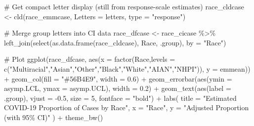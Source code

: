 \documentclass[
  letterpaper,
  DIV=11,
  numbers=noendperiod]{scrartcl}
\newenvironment{Shaded}{\begin{snugshade}}{\end{snugshade}}
\newcommand{\AttributeTok}[1]{\textcolor[rgb]{0.40,0.45,0.13}{#1}}
\newcommand{\CommentTok}[1]{\textcolor[rgb]{0.37,0.37,0.37}{#1}}
\newcommand{\DecValTok}[1]{\textcolor[rgb]{0.68,0.00,0.00}{#1}}
\newcommand{\FloatTok}[1]{\textcolor[rgb]{0.68,0.00,0.00}{#1}}
\newcommand{\FunctionTok}[1]{\textcolor[rgb]{0.28,0.35,0.67}{#1}}
\newcommand{\NormalTok}[1]{\textcolor[rgb]{0.00,0.23,0.31}{#1}}
\newcommand{\OtherTok}[1]{\textcolor[rgb]{0.00,0.23,0.31}{#1}}
\newcommand{\SpecialCharTok}[1]{\textcolor[rgb]{0.37,0.37,0.37}{#1}}
\newcommand{\StringTok}[1]{\textcolor[rgb]{0.13,0.47,0.30}{#1}}
\begin{document}
\begin{Shaded}
\begin{Highlighting}[]
\CommentTok{\# Get compact letter display (still from response{-}scale estimates)}
\NormalTok{race\_cldcase }\OtherTok{\textless{}{-}} \FunctionTok{cld}\NormalTok{(race\_emmcase, }\AttributeTok{Letters =}\NormalTok{ letters, }\AttributeTok{type =} \StringTok{"response"}\NormalTok{)}

\CommentTok{\# Merge group letters into CI data}
\NormalTok{race\_dfcase }\OtherTok{\textless{}{-}}\NormalTok{ race\_cicase }\SpecialCharTok{\%\textgreater{}\%}
  \FunctionTok{left\_join}\NormalTok{(}\FunctionTok{select}\NormalTok{(}\FunctionTok{as.data.frame}\NormalTok{(race\_cldcase), Race, .group), }\AttributeTok{by =} \StringTok{"Race"}\NormalTok{)}

\CommentTok{\# Plot}
\FunctionTok{ggplot}\NormalTok{(race\_dfcase, }\FunctionTok{aes}\NormalTok{(}\AttributeTok{x =} \FunctionTok{factor}\NormalTok{(Race,}\AttributeTok{levels =} \FunctionTok{c}\NormalTok{(}\StringTok{"Multiracial"}\NormalTok{,}\StringTok{"Asian"}\NormalTok{,}\StringTok{"Other"}\NormalTok{,}\StringTok{"Black"}\NormalTok{,}\StringTok{"White"}\NormalTok{,}\StringTok{"AIAN"}\NormalTok{,}\StringTok{"NHPI"}\NormalTok{)), }\AttributeTok{y =}\NormalTok{ emmean)) }\SpecialCharTok{+}
  \FunctionTok{geom\_col}\NormalTok{(}\AttributeTok{fill =} \StringTok{"\#56B4E9"}\NormalTok{, }\AttributeTok{width =} \FloatTok{0.6}\NormalTok{) }\SpecialCharTok{+}
  \FunctionTok{geom\_errorbar}\NormalTok{(}\FunctionTok{aes}\NormalTok{(}\AttributeTok{ymin =}\NormalTok{ asymp.LCL, }\AttributeTok{ymax =}\NormalTok{ asymp.UCL), }\AttributeTok{width =} \FloatTok{0.2}\NormalTok{) }\SpecialCharTok{+}
  \FunctionTok{geom\_text}\NormalTok{(}\FunctionTok{aes}\NormalTok{(}\AttributeTok{label =}\NormalTok{ .group), }\AttributeTok{vjust =} \SpecialCharTok{{-}}\FloatTok{0.5}\NormalTok{, }\AttributeTok{size =} \DecValTok{5}\NormalTok{, }\AttributeTok{fontface =} \StringTok{"bold"}\NormalTok{) }\SpecialCharTok{+}
  \FunctionTok{labs}\NormalTok{(}
    \AttributeTok{title =} \StringTok{"Estimated COVID{-}19 Proportion of Cases by Race"}\NormalTok{,}
    \AttributeTok{x =} \StringTok{"Race"}\NormalTok{,}
    \AttributeTok{y =} \StringTok{"Adjusted Proportion (with 95\% CI)"}
\NormalTok{  ) }\SpecialCharTok{+}
  \FunctionTok{theme\_bw}\NormalTok{()}
\end{Highlighting}
\end{Shaded}
\end{document}

